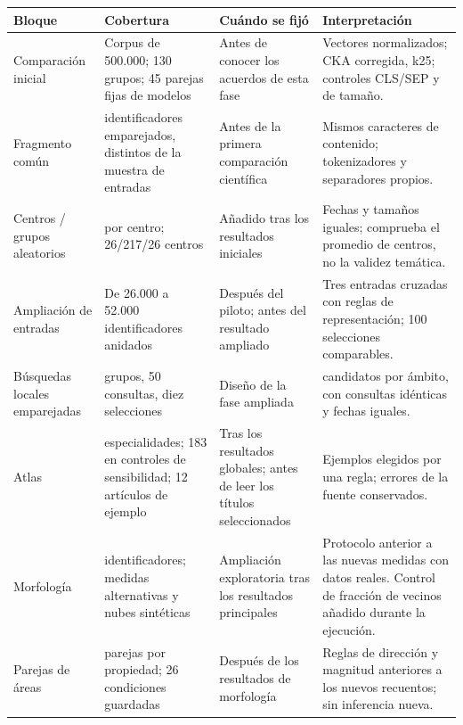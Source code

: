 \par\noindent\begin{minipage}{\linewidth}
\small
\setlength{\tabcolsep}{4pt}
\renewcommand{\arraystretch}{1.13}
\label{tab:S03}
\begin{tabular}{@{}>{\raggedright\arraybackslash}p{2.6cm}>{\raggedright\arraybackslash}p{4.1cm}>{\raggedright\arraybackslash}p{3.4cm}>{\raggedright\arraybackslash}p{5.05cm}@{}}
\toprule
\textbf{Bloque} & \textbf{Cobertura} & \textbf{Cuándo se fijó} & \textbf{Interpretación} \\
\midrule
Comparación inicial & Corpus de 500.000; 130 grupos; 45 parejas fijas de modelos & Antes de conocer los acuerdos de esta fase & Vectores normalizados; CKA corregida, k25; controles CLS/SEP y de tamaño. \\
Fragmento común & 52.000 identificadores emparejados, distintos de la muestra de entradas & Antes de la primera comparación científica & Mismos caracteres de contenido; tokenizadores y separadores propios. \\
Centros / grupos aleatorios & 256 por centro; 26/217/26 centros & Añadido tras los resultados iniciales & Fechas y tamaños iguales; comprueba el promedio de centros, no la validez temática. \\
Ampliación de entradas & De 26.000 a 52.000 identificadores anidados & Después del piloto; antes del resultado ampliado & Tres entradas cruzadas con reglas de representación; 100 selecciones comparables. \\
Búsquedas locales emparejadas & 217 grupos, 50 consultas, diez selecciones & Diseño de la fase ampliada & 256 candidatos por ámbito, con consultas idénticas y fechas iguales. \\
Atlas & 217 especialidades; 183 en controles de sensibilidad; 12 artículos de ejemplo & Tras los resultados globales; antes de leer los títulos seleccionados & Ejemplos elegidos por una regla; errores de la fuente conservados. \\
Morfología & 52.000 identificadores; medidas alternativas y nubes sintéticas & Ampliación exploratoria tras los resultados principales & Protocolo anterior a las nuevas medidas con datos reales. Control de fracción de vecinos añadido durante la ejecución. \\
Parejas de áreas & 325 parejas por propiedad; 26 condiciones guardadas & Después de los resultados de morfología & Reglas de dirección y magnitud anteriores a los nuevos recuentos; sin inferencia nueva. \\
\bottomrule
\end{tabular}
\end{minipage}\par
\par{}
